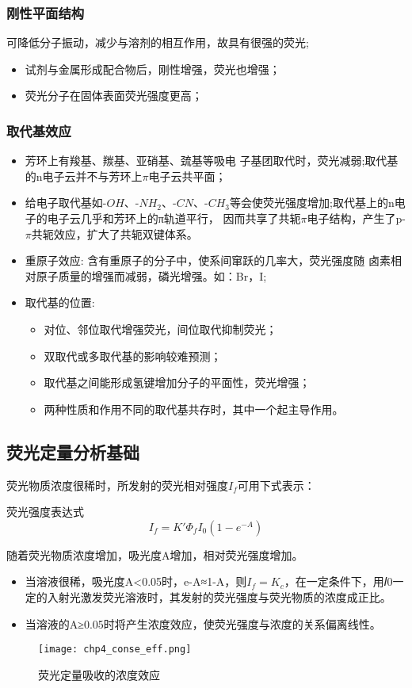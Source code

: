 \subsubsection{刚性平面结构}
可降低分子振动，减少与溶剂的相互作用，故具有很强的荧光;
\begin{itemize}
	\item 试剂与金属形成配合物后，刚性增强，荧光也增强；
	\item 荧光分子在固体表面荧光强度更高；
\end{itemize}
\subsubsection{取代基效应}
\begin{itemize}
	\item 芳环上有羧基、羰基、亚硝基、巯基等吸电 子基团取代时，荧光减弱;取代基的n电子云并不与芳环上$\pi$电子云共平面；
	\item 给电子取代基如-$OH$、-$NH_{2}$、-$CN$、-$CH_{3}$等会使荧光强度增加;取代基上的n电子的电子云几乎和芳环上的π轨道平行， 因而共享了共轭$\pi$电子结构，产生了p- $\pi$共轭效应，扩大了共轭双键体系。
	\item 重原子效应: 含有重原子的分子中，使系间窜跃的几率大，荧光强度随 卤素相对原子质量的增强而减弱，磷光增强。如：Br，I;
	\item 取代基的位置:
	\begin{itemize}
		\item 对位、邻位取代增强荧光，间位取代抑制荧光；
		\item 双取代或多取代基的影响较难预测；
		\item 取代基之间能形成氢键增加分子的平面性，荧光增强；
		\item 两种性质和作用不同的取代基共存时，其中一个起主导作用。
	\end{itemize}
\end{itemize}

\subsection{荧光定量分析基础}
荧光物质浓度很稀时，所发射的荧光相对强度$I_{f}$可用下式表示：
\begin{theorem*}{荧光强度表达式}
	\begin{equation*}
		I_{f}=K'\Phi_{f}I_{0}(1-e^{-A})
	\end{equation*}
\end{theorem*}
随着荧光物质浓度增加，吸光度A增加，相对荧光强度增加。
\begin{itemize}
	\item 当溶液很稀，吸光度A<0.05时，e-A≈1-A，则$I_{f}=K_{c}$，在一定条件下，用𝐼0一定的入射光激发荧光溶液时，其发射的荧光强度与荧光物质的浓度成正比。
	\item 当溶液的A≥0.05时将产生浓度效应，使荧光强度与浓度的关系偏离线性。
\end{itemize}
\begin{figure}
	\centering
	\texttt{[image: chp4\_conse\_eff.png]}
	\label{fig:chp4conseeff}
	\caption{荧光定量吸收的浓度效应}
\end{figure}
